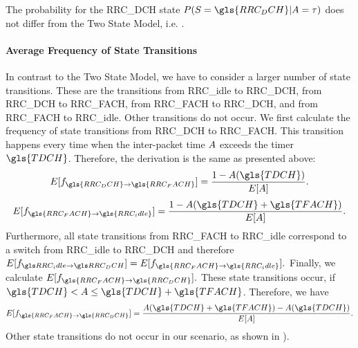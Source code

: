 The probability for the \gls{RRC_DCH} state \(P(\RRCState=\gls{RRC_DCH} \vert \PacketIAT = \ObservationIntervalLength)\) does not differ from the Two State Model, i.e. .

\paragraph*{Average Frequency of State Transitions}

\newcommand{\fStateTransitionsDCHToFACH}{f_{\gls{RRC_DCH}\rightarrow\gls{RRC_FACH}}}
\newcommand{\fStateTransitionsFACHToIdle}{f_{\gls{RRC_FACH}\rightarrow\gls{RRC_idle}}}
\newcommand{\fStateTransitionsFACHToDCH}{f_{\gls{RRC_FACH}\rightarrow\gls{RRC_DCH}}}

In contrast to the Two State Model, we have to consider a larger number of state transitions.
These are the transitions from \gls{RRC_idle} to \gls{RRC_DCH}, from \gls{RRC_DCH} to \gls{RRC_FACH}, from \gls{RRC_FACH} to \gls{RRC_DCH}, and from \gls{RRC_FACH} to \gls{RRC_idle}.
Other transitions do not occur.
We first calculate the frequency of state transitions from \gls{RRC_DCH} to \gls{RRC_FACH}.
This transition happens every time when the inter-packet time \(A\) exceeds the timer \(\gls{TDCH}\).
Therefore, the derivation is the same as presented above:
\begin{equation*}
E[\fStateTransitionsDCHToFACH]=\frac{1-\PacketIAT(\gls{TDCH})}{E[\PacketIAT]}.
\end{equation*}
\begin{equation*}
E[\fStateTransitionsFACHToIdle]=\frac{1-\PacketIAT(\gls{TDCH}+\gls{TFACH})}{E[\PacketIAT]}.
\end{equation*}
Furthermore, all state transitions from \gls{RRC_FACH} to \gls{RRC_idle} correspond to a switch from \gls{RRC_idle} to \gls{RRC_DCH} and therefore 
\(E[\fStateTransitionsIdleToDCH]=E[\fStateTransitionsFACHToIdle].\)
Finally, we calculate \(E[\fStateTransitionsFACHToDCH].\)
These state transitions occur, if \(\gls{TDCH}<\PacketIAT \leq \gls{TDCH}+\gls{TFACH}\).
Therefore, we have 
\begin{equation*}
E[\fStateTransitionsFACHToDCH]=\frac{\PacketIAT(\gls{TDCH}+\gls{TFACH})-\PacketIAT(\gls{TDCH})}{E[\PacketIAT]}.
\end{equation*}
Other state transitions do not occur in our scenario, as shown in ).

